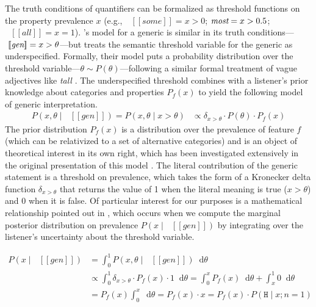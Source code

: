 \documentclass[10pt,letterpaper]{article}
\newcommand{\denote}[1]{\mbox{ $[\![ #1 ]\!]$}}
\begin{document}
The truth conditions of quantifiers can be formalized as threshold functions on the property prevalence $x$ (e.g., $\denote{some} = x > 0$; $\emph{most}= x > 0.5$; $\denote{all} = x = 1$).  's model for a generic is similar in its truth conditions---$\denote{\emph{gen}} = x > \theta$---but treats the semantic threshold variable for the generic as underspecified. 
Formally, their model puts a probability distribution over the threshold variable---$\theta \sim P(\theta)$---following a similar formal treatment of vague adjectives like \emph{tall} \cite{lassiter2017adjectival}. 
The underspecified threshold combines with a listener's prior knowledge about categories and properties $P_f(x)$ to yield the following model of generic interpretation.
\begin{align}
P (x, \theta \mid \denote{gen}) = P (x, \theta \mid x >  \theta) &\propto \delta_{x > \theta} \cdot P(\theta) \cdot P_f(x)  \label{eq:L0}
\end{align}
The prior distribution $P_f(x)$ is a distribution over the prevalence of feature $f$ (which can be relativized to a set of alternative categories) and is an object of theoretical interest in its own right, which has been investigated extensively in the original presentation of this model \cite{tessler2019language,tessler2020learning}. 
The literal contribution of the generic statement is a threshold on prevalence, which takes the form of a Kronecker delta function $\delta_{x > \theta}$ that returns the value of 1 when the literal meaning is true ($x > \theta$) and 0 when it is false. 
Of particular interest for our purposes is a mathematical relationship pointed out in , which occurs when we compute the marginal posterior distribution on prevalence $P(x \mid \denote{gen})$ by integrating over the listener's uncertainty about the threshold variable. 

\begin{align}
P(x \mid \denote{gen}) &=  \int_{0}^{1} P (x, \theta \mid \denote{gen}) \mathop{}\!\mathrm{d}\theta \nonumber
\\
& \propto  \int_{0}^{1} \delta_{x > \theta}  \cdot P_f(x) \cdot 1 \mathop{}\!\mathrm{d}\theta \nonumber  = \int_{0}^{x} P_f(x) \mathop{}\!\mathrm{d}\theta + \int_{x}^{1} 0 \mathop{}\!\mathrm{d}\theta \nonumber  \\
 &    = P_f(x) \int_{0}^{x} \mathop{}\!\mathrm{d}\theta   =  P_f(x) \cdot x  = P_f(x) \cdot P(\texttt{H} \mid x; n=1)\label{eq:L0d}
\end{align}
\end{document}
